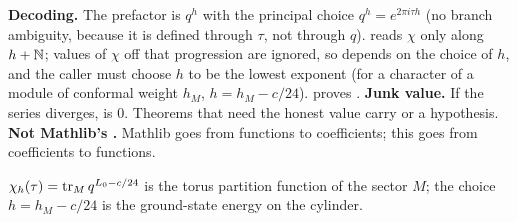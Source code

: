 \begin{dictionary}
\textbf{Decoding.} The prefactor  is $q^h$ with the principal choice $q^h = e^{2\pi i\tau h}$ (no branch
ambiguity, because it is defined through $\tau$, not through $q$).  reads $\chi$ only along $h+{\mathbb{N}}$; values of
$\chi$ off that progression are ignored, so  depends on the choice of $h$, and the caller must choose $h$
to be the lowest exponent (for a character of a module of conformal weight $h_M$, $h = h_M - c/24$). 
proves . \textbf{Junk value.} If the series diverges,  is $0$.
Theorems that need the honest value carry  or a  hypothesis. \textbf{Not Mathlib's
.} Mathlib goes from functions to coefficients; this goes from coefficients to functions.
\end{dictionary}
\begin{physics}
$\chi_h(\tau) = \operatorname{tr}_Mq^{L_0-c/24}$ is the torus partition function of the sector $M$; the choice $h = h_M - c/24$ is the
ground-state energy on the cylinder.
\end{physics}

